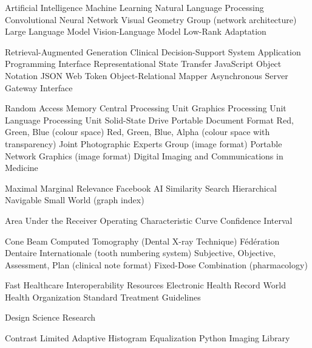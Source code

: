 \documentclass[12pt,a4paper]{report}
\begin{document}
	\begin{acronym}[AUROC]  %
		
		    {Artificial Intelligence}
		    {Machine Learning}
		   {Natural Language Processing}
		   {Convolutional Neural Network}
		   {Visual Geometry Group (network architecture)}
		   {Large Language Model}
		   {Vision-Language Model}
		  {Low-Rank Adaptation}
		
		   {Retrieval-Augmented Generation}
		  {Clinical Decision-Support System}
		   {Application Programming Interface}
		  {Representational State Transfer}
		  {JavaScript Object Notation}
		   {JSON Web Token}
		   {Object-Relational Mapper}
		  {Asynchronous Server Gateway Interface}
		
		   {Random Access Memory}
		   {Central Processing Unit}
		   {Graphics Processing Unit}
		   {Language Processing Unit}
		   {Solid-State Drive}
		   {Portable Document Format}
		   {Red, Green, Blue (colour space)}
		  {Red, Green, Blue, Alpha (colour space with transparency)}
		  {Joint Photographic Experts Group (image format)}
		   {Portable Network Graphics (image format)}
		 {Digital Imaging and Communications in Medicine}
		
		   {Maximal Marginal Relevance}
		 {Facebook AI Similarity Search}
		  {Hierarchical Navigable Small World (graph index)}
		
		 {Area Under the Receiver Operating Characteristic Curve}
		    {Confidence Interval}
		
		  {Cone Beam Computed Tomography} (Dental X-ray Technique)
		   {F\'{e}d\'{e}ration Dentaire Internationale (tooth numbering system)}
		  {Subjective, Objective, Assessment, Plan (clinical note format)}
		   {Fixed-Dose Combination (pharmacology)}
		
		  {Fast Healthcare Interoperability Resources}
		   {Electronic Health Record}
		   {World Health Organization}
		   {Standard Treatment Guidelines}
		
		   {Design Science Research}
		
		 {Contrast Limited Adaptive Histogram Equalization}
		   {Python Imaging Library}
		
	\end{acronym}
	
\end{document}
